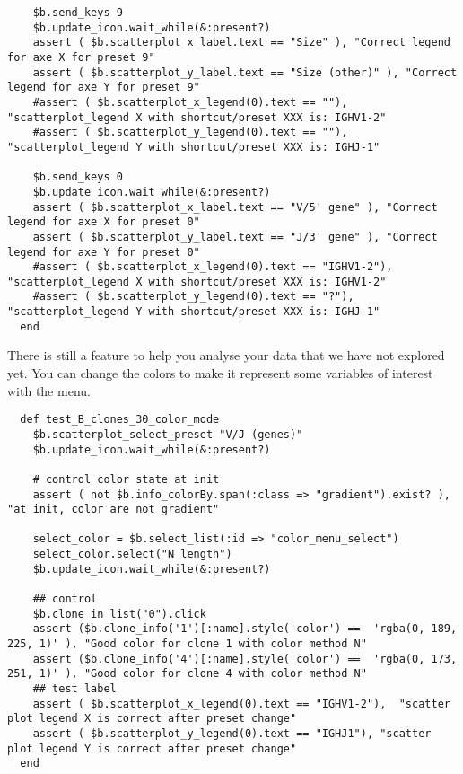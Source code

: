 \begin{verbatim}
    $b.send_keys 9
    $b.update_icon.wait_while(&:present?)
    assert ( $b.scatterplot_x_label.text == "Size" ), "Correct legend for axe X for preset 9"
    assert ( $b.scatterplot_y_label.text == "Size (other)" ), "Correct legend for axe Y for preset 9"
    #assert ( $b.scatterplot_x_legend(0).text == ""), "scatterplot_legend X with shortcut/preset XXX is: IGHV1-2"
    #assert ( $b.scatterplot_y_legend(0).text == ""), "scatterplot_legend Y with shortcut/preset XXX is: IGHJ-1"

    $b.send_keys 0
    $b.update_icon.wait_while(&:present?)
    assert ( $b.scatterplot_x_label.text == "V/5' gene" ), "Correct legend for axe X for preset 0"
    assert ( $b.scatterplot_y_label.text == "J/3' gene" ), "Correct legend for axe Y for preset 0"
    #assert ( $b.scatterplot_x_legend(0).text == "IGHV1-2"), "scatterplot_legend X with shortcut/preset XXX is: IGHV1-2"
    #assert ( $b.scatterplot_y_legend(0).text == "?"), "scatterplot_legend Y with shortcut/preset XXX is: IGHJ-1"
  end
\end{verbatim}

There is still a feature to help you analyse your data that we have not
explored yet.
You can change the colors to make it represent some variables of interest
with the  menu.
\begin{verbatim}
  def test_B_clones_30_color_mode
    $b.scatterplot_select_preset "V/J (genes)"
    $b.update_icon.wait_while(&:present?)

    # control color state at init
    assert ( not $b.info_colorBy.span(:class => "gradient").exist? ), "at init, color are not gradient"

    select_color = $b.select_list(:id => "color_menu_select")
    select_color.select("N length")
    $b.update_icon.wait_while(&:present?)
    
    ## control
    $b.clone_in_list("0").click
    assert ($b.clone_info('1')[:name].style('color') ==  'rgba(0, 189, 225, 1)' ), "Good color for clone 1 with color method N"
    assert ($b.clone_info('4')[:name].style('color') ==  'rgba(0, 173, 251, 1)' ), "Good color for clone 4 with color method N"
    ## test label
    assert ( $b.scatterplot_x_legend(0).text == "IGHV1-2"),  "scatter plot legend X is correct after preset change"
    assert ( $b.scatterplot_y_legend(0).text == "IGHJ1"), "scatter plot legend Y is correct after preset change"
  end
\end{verbatim}
  
